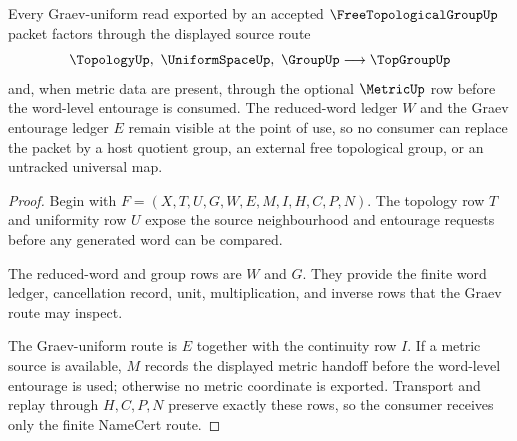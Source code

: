 \begin{theorem}
\label{thm:free-topological-group-graev-uniform-route}
Every Graev-uniform read exported by an accepted $\FreeTopologicalGroupUp$ packet factors through the displayed source route
$$
\TopologyUp,\ \UniformSpaceUp,\ \GroupUp \longrightarrow \TopGroupUp
$$
and, when metric data are present, through the optional $\MetricUp$ row before the word-level entourage is consumed. The reduced-word ledger $W$ and the Graev entourage ledger $E$ remain visible at the point of use, so no consumer can replace the packet by a host quotient group, an external free topological group, or an untracked universal map.
\end{theorem}
\begin{proof}
Begin with $F=(X,T,U,G,W,E,M,I,H,C,P,N)$. The topology row $T$ and uniformity row $U$ expose the source neighbourhood and entourage requests before any generated word can be compared.

The reduced-word and group rows are $W$ and $G$. They provide the finite word ledger, cancellation record, unit, multiplication, and inverse rows that the Graev route may inspect.

The Graev-uniform route is $E$ together with the continuity row $I$. If a metric source is available, $M$ records the displayed metric handoff before the word-level entourage is used; otherwise no metric coordinate is exported. Transport and replay through $H,C,P,N$ preserve exactly these rows, so the consumer receives only the finite NameCert route.
\end{proof}


\begin{closurestatus}{\FreeTopologicalGroupUp}
  \theoryclosure{\seedClosure}
  \formalstatus{\unformalizedV}
\end{closurestatus}
